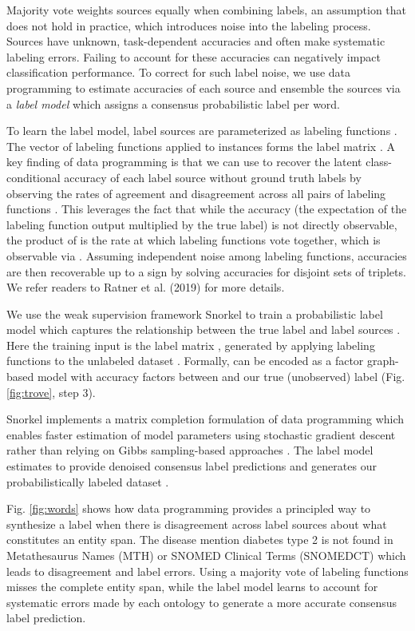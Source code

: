 \documentclass{article}
\begin{document}
Majority vote weights sources equally when combining labels, an assumption that does not hold in practice, which introduces noise into the labeling process. 
Sources have unknown, task-dependent accuracies and often make systematic labeling errors.
Failing to account for these accuracies can negatively impact classification performance.
To correct for such {label noise}, we use data programming \cite{Ratner2016-so} to estimate accuracies of each source and ensemble the sources via a \emph{label model} which assigns a consensus probabilistic label per word. 

To learn the label model,  label sources are parameterized as labeling functions . 
The vector of  labeling functions applied to  instances forms the label matrix . 
A key finding of data programming is that we can use  to recover the latent class-conditional accuracy of each label source without ground truth labels by observing the rates of agreement and disagreement across all pairs of labeling functions  \cite{Ratner2016-so}.
This leverages the fact that while the accuracy  (the expectation of the labeling function output  multiplied by the true label) is not directly observable, the product of   is the rate at which labeling functions vote together, which is observable via .
Assuming independent noise among labeling functions, accuracies are then recoverable up to a sign by solving accuracies for disjoint sets of triplets. 
We refer readers to Ratner et al. (2019) \cite{Ratner2019-xo} for more details. 

We use the weak supervision framework Snorkel \cite{Ratner2017-rc} to train a probabilistic label model which captures the relationship between the true label and label sources . 
Here the training input is the label matrix , generated by applying labeling functions  to the unlabeled dataset . 
Formally,  can be encoded as a factor graph-based model with  accuracy factors between  and our true (unobserved) label  (Fig. \ref{fig:trove}, step 3).

Snorkel implements a matrix completion formulation of data programming which enables faster estimation of model parameters  using stochastic gradient descent rather than relying on Gibbs sampling-based approaches \cite{Ratner2019-xo}. 
The label model estimates  to provide {denoised} consensus label predictions  and generates our probabilistically labeled dataset .   

Fig. \ref{fig:words} shows how data programming provides a principled way to synthesize a label when there is disagreement across label sources about what constitutes an entity span. 
The disease mention {diabetes type 2} is not found in Metathesaurus Names (MTH) or SNOMED Clinical Terms (SNOMEDCT) which leads to disagreement and label errors. 
Using a majority vote of labeling functions misses the complete entity span, while the label model learns to account for systematic errors made by each ontology to generate a more accurate consensus label prediction. 
\end{document}
